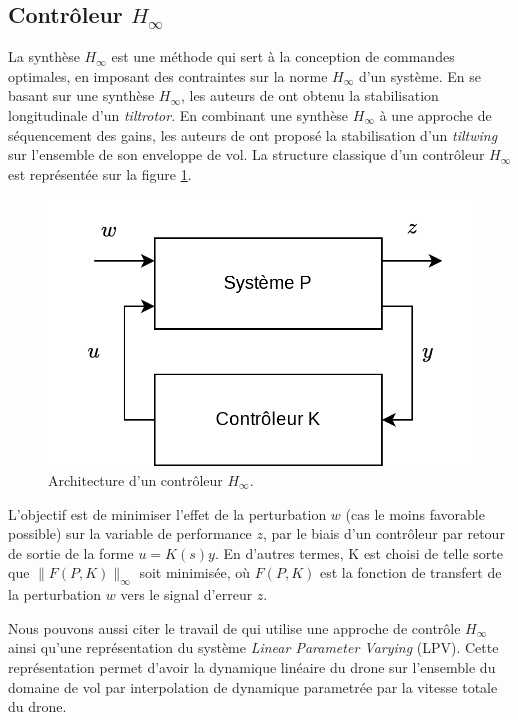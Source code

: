 \subsection*{Contrôleur $H_{\infty}$}
La synthèse $H_{\infty}$ est une méthode qui sert à la conception de commandes optimales, en imposant des contraintes sur la norme $H_{\infty}$ d'un système. En se basant sur une synthèse $H_{\infty}$, les auteurs de \cite{SunYang2009} ont obtenu la stabilisation longitudinale d'un \textit{tiltrotor}. En combinant une synthèse $H_{\infty}$ à une approche de séquencement des gains, les auteurs de \cite{DickesonMix2005, DickesonCifdaloz2006,DickesonMiles2007} ont proposé la stabilisation d'un \textit{tiltwing} sur l'ensemble de son enveloppe de vol. La structure classique d'un contrôleur $H_{\infty}$ est représentée sur la figure \ref{fig:schemalft}. 

\begin{figure}[ht!]
    \centerline{
    \includegraphics[trim=0cm 0cm 0cm 0cm,clip,width=0.5\columnwidth]{figures/lft.png}}
    \caption{Architecture d'un contrôleur $H_{\infty}$.}
    \label{fig:schemalft}
\end{figure}

L'objectif est de minimiser l'effet de la perturbation $w$  (cas le moins favorable possible) sur la variable de performance $z$, par le biais d'un contrôleur par retour de sortie de la forme $u = K(s) y$. En d'autres termes, K est choisi de telle sorte que $\| F(P, K)\|_{\infty}$  soit minimisée, où $F(P, K)$ est la fonction de transfert de la perturbation $w$ vers le signal d'erreur $z$. 

Nous pouvons aussi citer le travail de \cite{SNYDER2021106621} qui utilise une approche de contrôle $H_{\infty}$ ainsi qu'une représentation du système \textit{Linear Parameter Varying} (LPV). Cette représentation permet d'avoir la dynamique linéaire du drone sur l'ensemble du domaine de vol par interpolation de dynamique parametrée par la vitesse totale du drone.


